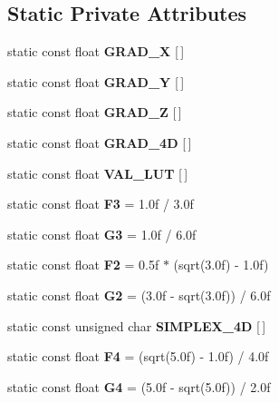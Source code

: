 \subsection*{Static Private Attributes}
\begin{DoxyCompactItemize}
\item 
static const float {\bfseries G\+R\+A\+D\+\_\+X} \mbox{[}$\,$\mbox{]}
\item 
static const float {\bfseries G\+R\+A\+D\+\_\+Y} \mbox{[}$\,$\mbox{]}
\item 
static const float {\bfseries G\+R\+A\+D\+\_\+Z} \mbox{[}$\,$\mbox{]}
\item 
static const float {\bfseries G\+R\+A\+D\+\_\+4D} \mbox{[}$\,$\mbox{]}
\item 
static const float {\bfseries V\+A\+L\+\_\+\+L\+UT} \mbox{[}$\,$\mbox{]}
\item 
\mbox{\label{class_flounder_1_1_noise_fast_afafd0c238347b1a4d2328ed64c8ee19e}} 
static const float {\bfseries F3} = 1.\+0f / 3.\+0f
\item 
\mbox{\label{class_flounder_1_1_noise_fast_a2d26cf3c2203ebf2099411a4a4bb4984}} 
static const float {\bfseries G3} = 1.\+0f / 6.\+0f
\item 
\mbox{\label{class_flounder_1_1_noise_fast_a279d5069c46254a546122a5e2e5d7253}} 
static const float {\bfseries F2} = 0.\+5f $\ast$ (sqrt(3.\+0f) -\/ 1.\+0f)
\item 
\mbox{\label{class_flounder_1_1_noise_fast_aee3991b7f031d6fdce539d3276827909}} 
static const float {\bfseries G2} = (3.\+0f -\/ sqrt(3.\+0f)) / 6.\+0f
\item 
static const unsigned char {\bfseries S\+I\+M\+P\+L\+E\+X\+\_\+4D} \mbox{[}$\,$\mbox{]}
\item 
\mbox{\label{class_flounder_1_1_noise_fast_a67428722a50fdc50d40d2e19369eb76f}} 
static const float {\bfseries F4} = (sqrt(5.\+0f) -\/ 1.\+0f) / 4.\+0f
\item 
\mbox{\label{class_flounder_1_1_noise_fast_a5e31251644ead09ad7eb4cd5d3b8cd53}} 
static const float {\bfseries G4} = (5.\+0f -\/ sqrt(5.\+0f)) / 2.\+0f

\end{DoxyCompactItemize}
